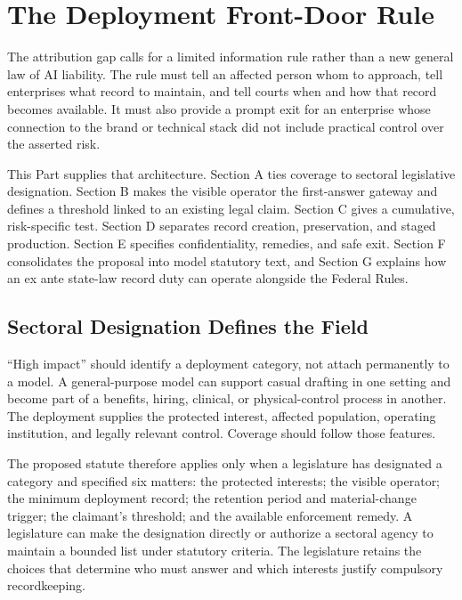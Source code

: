 \section{The Deployment Front-Door Rule}
\label{sec:rule}

The attribution gap calls for a limited information rule rather than a new general law of AI liability. The rule must tell an affected person whom to approach, tell enterprises what record to maintain, and tell courts when and how that record becomes available. It must also provide a prompt exit for an enterprise whose connection to the brand or technical stack did not include practical control over the asserted risk.

This Part supplies that architecture. Section A ties coverage to sectoral legislative designation. Section B makes the visible operator the first-answer gateway and defines a threshold linked to an existing legal claim. Section C gives  a cumulative, risk-specific test. Section D separates record creation, preservation, and staged production. Section E specifies confidentiality, remedies, and safe exit. Section F consolidates the proposal into model statutory text, and Section G explains how an ex ante state-law record duty can operate alongside the Federal Rules.

\subsection{Sectoral Designation Defines the Field}
\label{sec:designation}

``High impact'' should identify a deployment category, not attach permanently to a model. A general-purpose model can support casual drafting in one setting and become part of a benefits, hiring, clinical, or physical-control process in another. The deployment supplies the protected interest, affected population, operating institution, and legally relevant control. Coverage should follow those features.

The proposed statute therefore applies only when a legislature has designated a category and specified six matters: the protected interests; the visible operator; the minimum deployment record; the retention period and material-change trigger; the claimant's threshold; and the available enforcement remedy. A legislature can make the designation directly or authorize a sectoral agency to maintain a bounded list under statutory criteria. The legislature retains the choices that determine who must answer and which interests justify compulsory recordkeeping.

